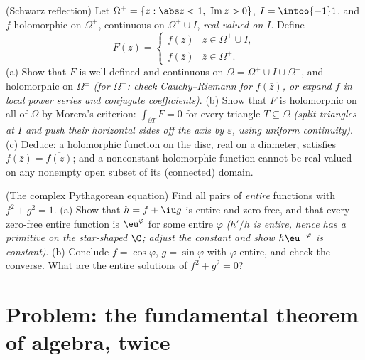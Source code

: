 \begin{exercise}[$\star\star\star$]\label{exo:b3:holomorphic:11}
(Schwarz reflection) Let $\Omega^+ = \{z : \abs z < 1,\
\operatorname{Im}z > 0\}$, $I = \intoo{-1}1$, and $f$
holomorphic on $\Omega^+$, continuous on $\Omega^+\cup I$,
\emph{real-valued on $I$}. Define
\[
F(z) = \begin{cases} f(z) & z \in \Omega^+\cup I,\\
\overline{f(\bar z)} & \bar z \in \Omega^+ . \end{cases}
\]
(a) Show that $F$ is well defined and continuous on
$\Omega = \Omega^+\cup I\cup\Omega^-$, and holomorphic on
$\Omega^\pm$ \emph{(for $\Omega^-$: check Cauchy--Riemann
for $\overline{f(\bar z)}$, or expand $f$ in local power
series and conjugate coefficients)}.
(b) Show that $F$ is holomorphic on all of $\Omega$ by
Morera's criterion: $\int_{\partial T}F = 0$ for every
triangle $T \subseteq \Omega$ \emph{(split triangles at $I$
and push their horizontal sides off the axis by
$\varepsilon$, using uniform continuity)}.
(c) Deduce: a holomorphic function on the disc, real on a
diameter, satisfies $f(\bar z) = \overline{f(z)}$; and a
nonconstant holomorphic function cannot be real-valued on
any nonempty open subset of its (connected) domain.
\end{exercise}

\begin{exercise}[$\star\star$]\label{exo:b3:holomorphic:12}
(The complex Pythagorean equation) Find all pairs of
\emph{entire} functions with $f^2 + g^2 = 1$.
(a) Show that $h = f + \iu g$ is entire and zero-free, and
that every zero-free entire function is $\eu^{\varphi}$ for
some entire $\varphi$ \emph{($h'/h$ is entire, hence has a
primitive on the star-shaped $\C$; adjust the constant and
show $h\eu^{-\varphi}$ is constant)}.
(b) Conclude $f = \cos\varphi$, $g = \sin\varphi$ with
$\varphi$ entire, and check the converse. What are the
entire solutions of $f^2 + g^2 = 0$?
\end{exercise}

\section{Problem: the fundamental theorem of algebra, twice}

